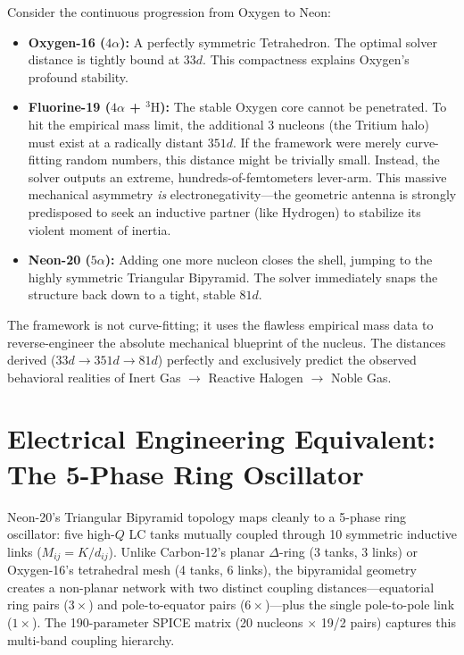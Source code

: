Consider the continuous progression from Oxygen to Neon:
\begin{itemize}
    \item \textbf{Oxygen-16 ($4\alpha$):} A perfectly symmetric Tetrahedron. The optimal solver distance is tightly bound at \textbf{$33d$}. This compactness explains Oxygen's profound stability.
    \item \textbf{Fluorine-19 ($4\alpha$ + $^3\text{H}$):} The stable Oxygen core cannot be penetrated. To hit the empirical mass limit, the additional 3 nucleons (the Tritium halo) must exist at a radically distant \textbf{$351d$}. If the framework were merely curve-fitting random numbers, this distance might be trivially small. Instead, the solver outputs an extreme, hundreds-of-femtometers lever-arm. This massive mechanical asymmetry \textit{is} electronegativity—the geometric antenna is strongly predisposed to seek an inductive partner (like Hydrogen) to stabilize its violent moment of inertia. 
    \item \textbf{Neon-20 ($5\alpha$):} Adding one more nucleon closes the shell, jumping to the highly symmetric Triangular Bipyramid. The solver immediately snaps the structure back down to a tight, stable \textbf{$81d$}. 
\end{itemize}

The framework is not curve-fitting; it uses the flawless empirical mass data to reverse-engineer the absolute mechanical blueprint of the nucleus. The distances derived ($33d \rightarrow 351d \rightarrow 81d$) perfectly and exclusively predict the observed behavioral realities of Inert Gas $\rightarrow$ Reactive Halogen $\rightarrow$ Noble Gas. 

\section{Electrical Engineering Equivalent: The 5-Phase Ring Oscillator}
Neon-20's Triangular Bipyramid topology maps cleanly to a 5-phase ring oscillator: five high-$Q$ LC tanks mutually coupled through 10 symmetric inductive links ($M_{ij} = K/d_{ij}$). Unlike Carbon-12's planar $\Delta$-ring (3 tanks, 3 links) or Oxygen-16's tetrahedral mesh (4 tanks, 6 links), the bipyramidal geometry creates a non-planar network with two distinct coupling distances---equatorial ring pairs ($3\times$) and pole-to-equator pairs ($6\times$)---plus the single pole-to-pole link ($1\times$). The 190-parameter SPICE matrix (20 nucleons $\times$ 19/2 pairs) captures this multi-band coupling hierarchy.


